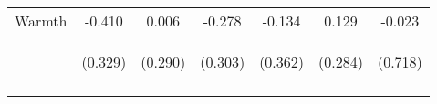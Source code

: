 \begin{tabular}{lcccccc}
\noalign{\smallskip}Warmth & -0.410 & 0.006 & -0.278 & -0.134 & 0.129 & -0.023\\
 & \begin{footnotesize}(0.329)\end{footnotesize} & \begin{footnotesize}(0.290)\end{footnotesize} & \begin{footnotesize}(0.303)\end{footnotesize} & \begin{footnotesize}(0.362)\end{footnotesize} & \begin{footnotesize}(0.284)\end{footnotesize} & \begin{footnotesize}(0.718)\end{footnotesize}\\
\noalign{\smallskip}\hline\end{tabular}\\
